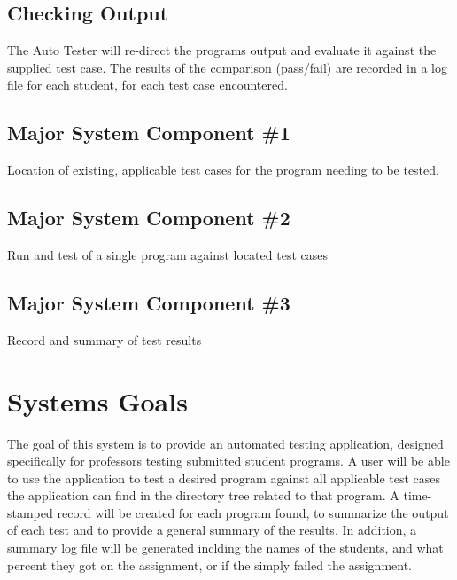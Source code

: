 \subsection{Checking Output}
The Auto Tester will re-direct the programs output and evaluate it against the supplied test case. 
The results of the comparison (pass/fail) are recorded in a log file for each student, for each 
test case encountered.



\subsection{Major System Component \#1}
Location of existing, applicable test cases for the program needing to be tested.

\subsection{Major System Component \#2}
Run and test of a single program against located test cases

\subsection{Major System Component \#3}
Record and summary of test results

\section{Systems Goals}
The goal of this system is to provide an automated testing application, designed specifically
for professors testing submitted student programs. A user will be able to use the application
to test a desired program against all applicable test cases the application can find in the directory tree 
related to that program.  A time-stamped record will be created for each program found, to summarize the 
output of each test and to provide a general summary of the results. In addition, a summary log file will be 
generated inclding the names of the students, and what percent they got on the assignment, or if the simply 
failed the assignment.

